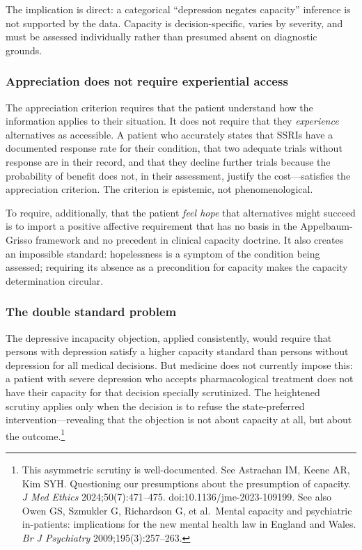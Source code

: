 \documentclass[11pt, letterpaper]{article}
\begin{document}
The implication is direct: a categorical ``depression negates capacity'' inference is
not supported by the data. Capacity is decision-specific, varies by severity, and must
be assessed individually rather than presumed absent on diagnostic grounds.

\subsubsection{Appreciation does not require experiential access}

The appreciation criterion requires that the patient understand how the information
applies to their situation. It does not require that they \textit{experience} alternatives
as accessible. A patient who accurately states that SSRIs have a documented response
rate for their condition, that two adequate trials without response are in their record,
and that they decline further trials because the probability of benefit does not, in
their assessment, justify the cost---satisfies the appreciation criterion. The criterion
is epistemic, not phenomenological.

To require, additionally, that the patient \textit{feel hope} that alternatives might
succeed is to import a positive affective requirement that has no basis in the
Appelbaum-Grisso framework and no precedent in clinical capacity doctrine. It also
creates an impossible standard: hopelessness is a symptom of the condition being
assessed; requiring its absence as a precondition for capacity makes the capacity
determination circular.

\subsubsection{The double standard problem}

The depressive incapacity objection, applied consistently, would require that persons
with depression satisfy a higher capacity standard than persons without depression for
all medical decisions. But medicine does not currently impose this: a patient with
severe depression who accepts pharmacological treatment does not have their capacity
for that decision specially scrutinized. The heightened scrutiny applies only when the
decision is to refuse the state-preferred intervention---revealing that the objection
is not about capacity at all, but about the outcome.\footnote{%
  This asymmetric scrutiny is well-documented. See Astrachan IM, Keene AR, Kim SYH.
  Questioning our presumptions about the presumption of capacity. \textit{J Med Ethics}
  2024;50(7):471--475. doi:10.1136/jme-2023-109199. See also Owen GS, Szmukler G,
  Richardson G, et al.\ Mental capacity and psychiatric in-patients: implications for
  the new mental health law in England and Wales. \textit{Br J Psychiatry}
  2009;195(3):257--263.}
\end{document}
